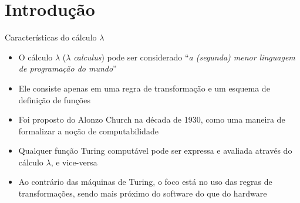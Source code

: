 \section{Introdução}

\begin{frame}[fragile]{Características do cálculo $\lambda$}

    \begin{itemize}
        \item O cálculo $\lambda$ ($\lambda$ \textit{calculus}) pode ser considerado 
            ``\textit{a (segunda) menor linguagem de programação do mundo}''

        \item Ele consiste apenas em uma regra de transformação e um esquema de definição de 
            funções

        \item Foi proposto do Alonzo Church na década de 1930, como uma maneira de formalizar a
            noção de computabilidade

        \item Qualquer função Turing computável pode ser expressa e avaliada através do cálculo 
            $\lambda$, e vice-versa
            
        \item Ao contrário das máquinas de Turing, o foco está no uso das regras de transformações, 
            sendo mais próximo do software do que do hardware
    \end{itemize}

\end{frame}
